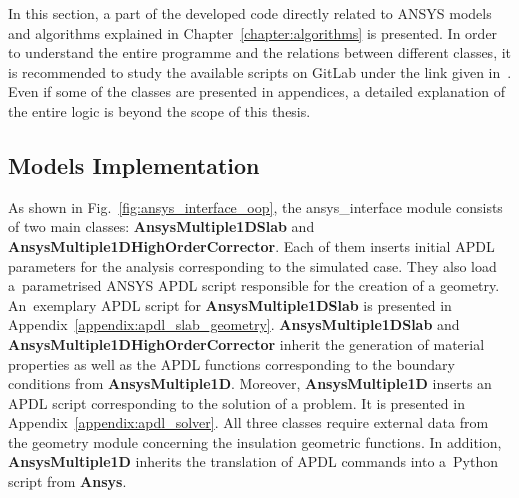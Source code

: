
In this section, a part of the developed code directly related to ANSYS models and algorithms explained in Chapter~\ref{chapter:algorithms} is presented. In order to understand the entire programme and the relations between different classes, it is recommended to study the available scripts on GitLab under the link given in~\cite{my_python_code}. Even if some of the classes are presented in appendices, a detailed explanation of the entire logic is beyond the scope of this thesis.


\subsection{Models Implementation}

As shown in Fig.~\ref{fig:ansys_interface_oop}, the ansys\_interface module consists of two main classes: \textbf{AnsysMultiple1DSlab} and \textbf{AnsysMultiple1DHighOrderCorrector}. Each of them inserts initial APDL parameters for the analysis corresponding to the simulated case. They also load a~parametrised ANSYS APDL script responsible for the creation of a geometry. An~exemplary APDL script for \textbf{AnsysMultiple1DSlab} is presented in Appendix~\ref{appendix:apdl_slab_geometry}. \textbf{AnsysMultiple1DSlab} and \textbf{AnsysMultiple1DHighOrderCorrector} inherit the generation of material properties as well as the APDL functions corresponding to the boundary conditions from \textbf{AnsysMultiple1D}. Moreover, \textbf{AnsysMultiple1D} inserts an APDL script corresponding to the solution of a problem. It is presented in Appendix~\ref{appendix:apdl_solver}. All three classes require external data from the geometry module concerning the insulation geometric functions. In addition, \textbf{AnsysMultiple1D} inherits the translation of APDL commands into a~Python script from \textbf{Ansys}.

